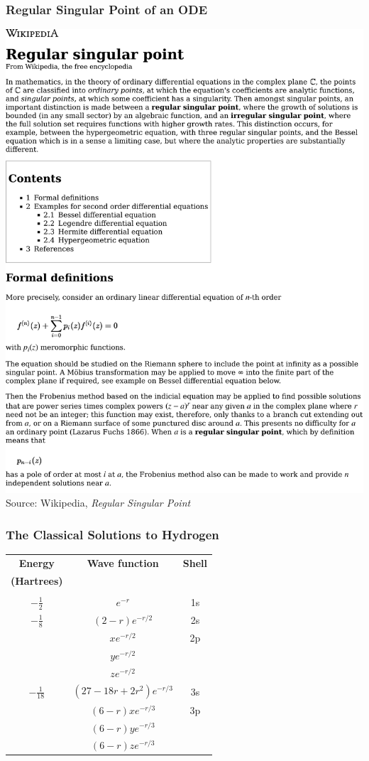 \documentclass{beamer}
\begin{document}
\begin{frame}
\frametitle{Regular Singular Point of an ODE}
\includegraphics[page=1, clip, trim=0in 0in 0in 6in, width=\textwidth]{Regular singular point - Wikipedia.pdf}
Source: Wikipedia, {\it Regular Singular Point}
\end{frame}

\begin{frame}
\frametitle{The Classical Solutions to Hydrogen}
\begin{center}
\begin{tabular}{ccc}
{\bf Energy}		& {\bf Wave function}		& {\bf Shell} \\
{\bf (Hartrees)}	& & \\
\\
$-\frac{1}{2}$		& $e^{-r}$			& 1s \\
$-\frac{1}{8}$		& $(2-r)e^{-r/2}$		& 2s \\
			& $xe^{-r/2}$			& 2p \\
			& $ye^{-r/2}$			\\
			& $ze^{-r/2}$			\\
$-\frac{1}{18}$		& $(27-18r+2r^2)e^{-r/3}$	& 3s \\
			& $(6-r)xe^{-r/3}$		& 3p \\
			& $(6-r)ye^{-r/3}$		\\
			& $(6-r)ze^{-r/3}$		\\
\end{tabular}
\end{center}
\end{frame}
\end{document}
